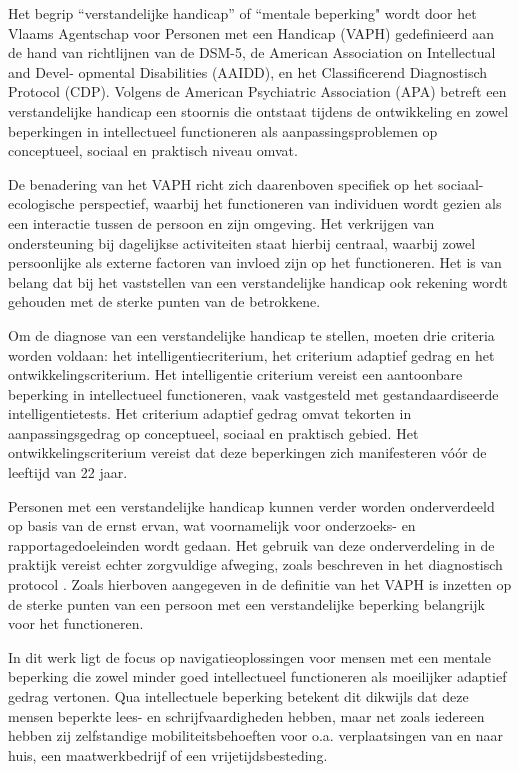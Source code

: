 Het begrip ``verstandelijke handicap'' of ``mentale beperking" wordt door het Vlaams Agentschap voor Personen met een Handicap (VAPH) gedefinieerd aan de hand van richtlijnen van de DSM-5, de American Association on Intellectual and Devel- opmental Disabilities (AAIDD), en het Classificerend Diagnostisch Protocol (CDP). Volgens de American Psychiatric Association (APA) betreft een verstandelijke handicap een stoornis die ontstaat tijdens de ontwikkeling en zowel beperkingen in intellectueel functioneren als aanpassingsproblemen op conceptueel, sociaal en praktisch niveau omvat.

De benadering van het VAPH richt zich daarenboven specifiek op het sociaal- ecologische perspectief, waarbij het functioneren van individuen wordt gezien als een interactie tussen de persoon en zijn omgeving. Het verkrijgen van ondersteuning bij dagelijkse activiteiten staat hierbij centraal, waarbij zowel persoonlijke als externe factoren van invloed zijn op het functioneren. Het is van belang dat bij het vaststellen van een verstandelijke handicap ook rekening wordt gehouden met de sterke punten van de betrokkene. 

Om de diagnose van een verstandelijke handicap te stellen, moeten drie criteria worden voldaan: het intelligentiecriterium, het criterium adaptief gedrag en het ontwikkelingscriterium. Het intelligentie criterium vereist een aantoonbare beperking in intellectueel functioneren, vaak vastgesteld met gestandaardiseerde intelligentietests. Het criterium adaptief gedrag omvat tekorten in aanpassingsgedrag op conceptueel, sociaal en praktisch gebied. Het ontwikkelingscriterium vereist dat deze beperkingen zich manifesteren vóór de leeftijd van 22 jaar. 

Personen met een verstandelijke handicap kunnen verder worden onderverdeeld op basis van de ernst ervan, wat voornamelijk voor on\-der\-zoeks- en rapportagedoeleinden wordt gedaan. Het gebruik van deze onderverdeling in de praktijk vereist echter zorgvuldige afweging, zoals beschreven in het diagnostisch protocol \autocite{VAPH}. Zoals hierboven aangegeven in de definitie van het VAPH is inzetten op de sterke punten van een persoon met een verstandelijke beperking belangrijk voor het functioneren.

In dit werk ligt de focus op navigatieoplossingen voor mensen met een mentale beperking die zowel minder goed intellectueel functioneren als moeilijker adaptief gedrag vertonen. Qua intellectuele beperking betekent dit dikwijls dat deze mensen beperkte lees- en schrijfvaardigheden hebben, maar net zoals iedereen hebben zij zelfstandige mobiliteitsbehoeften voor o.a. verplaatsingen van en naar huis, een maatwerkbedrijf of een vrijetijdsbesteding.

